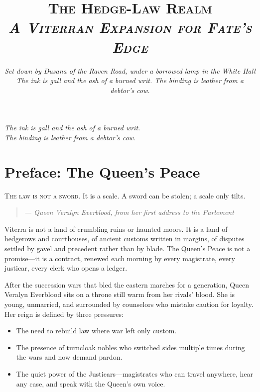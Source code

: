 \documentclass[11pt,twoside]{book}
\title{\Huge\scshape The Hedge-Law Realm\\\vspace{0.5em}\Large\normalfont\textit{A Viterran Expansion for Fate's Edge}}
\author{\textit{Set down by Dusana of the Raven Road, under a borrowed lamp in the White Hall}\\[0.5em]\small\textit{The ink is gall and the ash of a burned writ. The binding is leather from a debtor's cow.}}
\date{}
\newenvironment{quotebox}
{\begin{quote}\small\itshape}
{\end{quote}}
\begin{document}
\frontmatter

\maketitle

\thispagestyle{empty}
\begin{center}
\vspace*{2em}
\textit{The ink is gall and the ash of a burned writ.}\\
\textit{The binding is leather from a debtor's cow.}
\vspace{2em}
\end{center}

\tableofcontents

\mainmatter

\chapter*{Preface: The Queen's Peace}

\lettrine[lines=3,findent=2pt]{T}{he law is not a sword.} It is a scale. A sword can be stolen; a scale only tilts.

\begin{quotebox}
--- Queen Veralyn Everblood, from her first address to the Parlement
\end{quotebox}

Viterra is not a land of crumbling ruins or haunted moors. It is a land of hedgerows and courthouses, of ancient customs written in margins, of disputes settled by gavel and precedent rather than by blade. The Queen's Peace is not a promise---it is a contract, renewed each morning by every magistrate, every justicar, every clerk who opens a ledger.

After the succession wars that bled the eastern marches for a generation, Queen Veralyn Everblood sits on a throne still warm from her rivals' blood. She is young, unmarried, and surrounded by counselors who mistake caution for loyalty. Her reign is defined by three pressures:

\begin{itemize}
    \item The need to rebuild law where war left only custom.
    \item The presence of turncloak nobles who switched sides multiple times during the wars and now demand pardon.
    \item The quiet power of the Justicars---magistrates who can travel anywhere, hear any case, and speak with the Queen's own voice.
\end{itemize}
\end{document}
